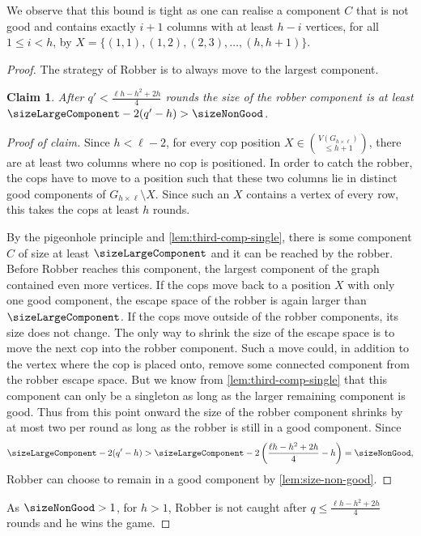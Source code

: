 \documentclass[10pt,a4paper]{article}
\newtheorem{claim}[theorem]{Claim}
\newcommand{\grid}[2]{\ensuremath{G_{#1 \times #2}}}
\newenvironment{claimproof}{\begin{proof}[Proof of claim]}{\end{proof}}
\begin{document}
We observe that this bound is tight as one can realise a component $C$ that is not good and contains exactly $i+1$ columns with at least $h-i$ vertices, for all $1\leq i<h$, by $X=\{(1,1),(1,2),(2,3),\ldots,(h,h+1)\}$.

\lowerBoundRounds*

\begin{proof}The strategy of Robber is to always move to the largest component.
	\begin{claim}
		After $q'< \frac{\ell h - h^2 + 2h}{4}$ rounds the size of the robber component is at least $\sizeLargeComponent-2(q'-h) > \sizeNonGood$.
	\end{claim}
	\begin{claimproof}
		Since $h < \ell-2$, for every cop position $X\in \binom{V(\grid{h}{\ell})}{\leq h+1}$, there are at least two columns where no cop is positioned.
		In order to catch the robber, the cops have to move to a position such that these two columns lie in distinct good components of  $\grid{h}{\ell}\setminus X$.
		Since such an $X$ contains a vertex of every row, this takes the cops at least $h$ rounds.
		
		By the pigeonhole principle and \cref{lem:third-comp-single}, there is some component $C$ of size at least $\sizeLargeComponent$ and it can be reached by the robber.
		Before Robber reaches this component, the largest component of the graph contained even more vertices.
		If the cops move back to a position $X$ with only one good component, the escape space of the robber is again larger than $\sizeLargeComponent$.
		If the cops move outside of the robber components, its size does not change.
		The only way to shrink the size of the escape space is to move the next cop into the robber component.
		Such a move could, in addition to the vertex where the cop is placed onto, remove some connected component from the robber escape space.
		But we know from \cref{lem:third-comp-single} that this component can only be a singleton as long as the larger remaining component is good.
		Thus from this point onward the size of the robber component shrinks by at most two per round as long as the robber is still in a good component.
		Since 
		\begin{equation*}
		\sizeLargeComponent - 2(q' - h)> \sizeLargeComponent -2\left(\frac{\ell h - h^2 + 2h}{4} - h\right) = \sizeNonGood,
		\end{equation*}
		Robber can choose to remain in a good component by \cref{lem:size-non-good}.
	\end{claimproof}
	As $\sizeNonGood>1$, for $h>1$, Robber is not caught after $q\leq \frac{\ell h - h^2 + 2h}{4}$ rounds and he wins the game.
\end{proof}
\end{document}
